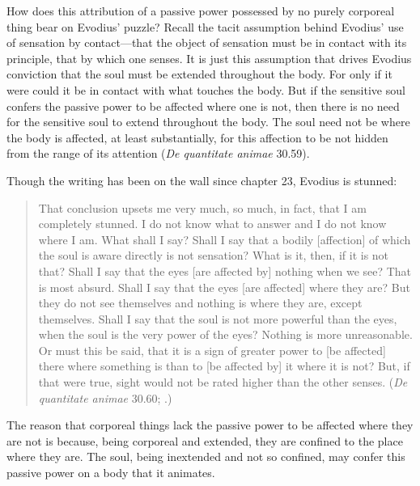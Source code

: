 \documentclass[12pt]{article}
\begin{document}
How does this attribution of a passive power possessed by no purely corporeal thing bear on Evodius' puzzle? Recall the tacit assumption behind Evodius' use of sensation by contact---that the object of sensation must be in contact with its principle, that by which one senses. It is just this assumption that drives Evodius conviction that the soul must be extended throughout the body. For only if it were could it be in contact with what touches the body. But if the sensitive soul confers the passive power to be affected where one is not, then there is no need for the sensitive soul to extend throughout the body. The soul need not be where the body is affected, at least substantially, for this affection to be not hidden from the range of its attention (\emph{De quantitate animae} 30.59). 

Though the writing has been on the wall since chapter 23, Evodius is stunned:
\begin{quote}
	That conclusion upsets me very much, so much, in fact, that I am completely stunned. I do not know what to answer and I do not know where I am. What shall I say? Shall I say that a bodily [affection] of which the soul is aware directly is not sensation? What is it, then, if it is not that? Shall I say that the eyes [are affected by] nothing when we see? That is most absurd. Shall I say that the eyes [are affected] where they are? But they do not see themselves and nothing is where they are, except themselves. Shall I say that the soul is not more powerful than the eyes, when the soul is the very power of the eyes? Nothing is more unreasonable. Or must this be said, that it is a sign of greater power to [be affected] there where something is than to [be affected by] it where it is not? But, if that were true, sight would not be rated higher than the other senses. (\emph{De quantitate animae} 30.60; \citealt[87]{Colleran:1949ys}.)
\end{quote}
The reason that corporeal things lack the passive power to be affected where they are not is because, being corporeal and extended, they are confined to the place where they are. The soul, being inextended and not so confined, may confer this passive power on a body that it animates.

\end{document}
